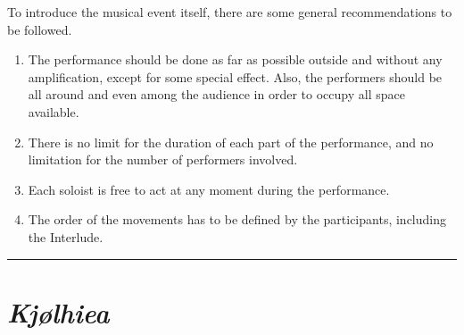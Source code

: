 \begin{description}
To introduce the musical event itself, there are some general recommendations to be followed.
\begin{enumerate}
\item The performance should be done as far as possible outside and without any amplification, except for some special effect. Also, the performers should be all around and even among the audience in order to occupy all space available.
\item There is no limit for the duration of each part of the performance, and no limitation for the number of performers involved.
\item Each soloist is free to act at any moment during the performance.
\item The order of the movements has to be defined by the participants, including the Interlude.
 \end{enumerate}
\end{description}

\bigskip
\begin{center}\rule{0.5\linewidth}{0.5pt}\end{center}
\bigskip

\section*{\textsl{Kj{\o}lhiea}}


\bigskip

